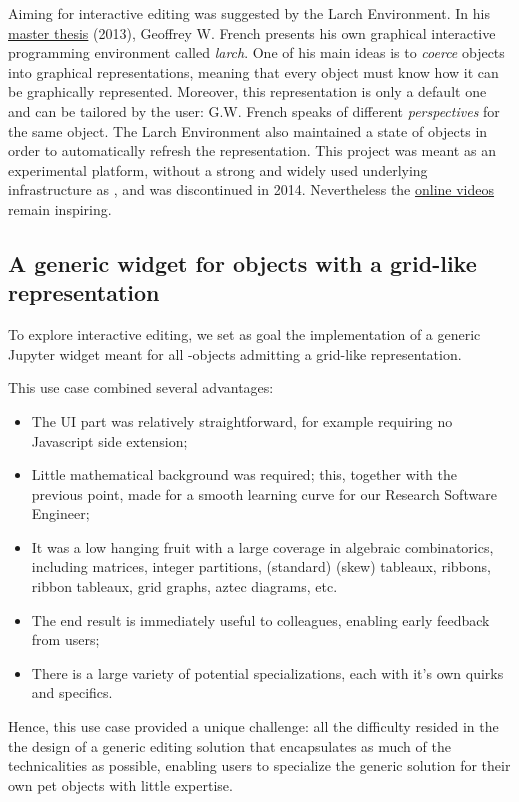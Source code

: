 \documentclass{deliverablereport}
\begin{document}
Aiming for interactive editing was suggested by the Larch Environment.
In his \href{https://core.ac.uk/download/pdf/9839511.pdf}{master
  thesis} (2013), Geoffrey W. French presents his own graphical
interactive programming environment called \emph{larch}. One of his
main ideas is to \emph{coerce} objects into graphical representations, 
meaning that every object must know how it can be graphically
represented. Moreover, this representation is only a default one and can be
tailored by the user: G.W. French speaks of different
\emph{perspectives} for the same object. The Larch Environment also
maintained a state of objects in order to automatically refresh the
representation. This project was meant as an experimental platform,
without a strong and widely used underlying infrastructure as \Jupyter,
and was discontinued in 2014. Nevertheless the
\href{https://www.youtube.com/watch?v=BaqaIw2c91o&t=29s}{online videos}
remain inspiring.

\subsection{A generic widget for objects with a grid-like representation}
\label{section:grid}

To explore interactive editing, we set as goal the implementation of a
generic Jupyter widget meant for all \Sage-objects admitting a
grid-like representation.

This use case combined several advantages:
\begin{itemize}
\item The UI part was relatively straightforward, for example
  requiring no Javascript side extension;
\item Little mathematical background was required; this, together with
  the previous point, made for a smooth learning curve for our
  Research Software Engineer;
\item It was a low hanging fruit with a large coverage in algebraic
  combinatorics, including matrices, integer partitions, (standard)
  (skew) tableaux, ribbons, ribbon tableaux, grid graphs, aztec
  diagrams, etc.
\item The end result is immediately useful to colleagues, enabling
  early feedback from users;
\item There is a large variety of potential specializations, each with
  it's own quirks and specifics.
\end{itemize}
Hence, this use case provided a unique challenge: all the difficulty
resided in the the design of a generic editing solution that encapsulates as
much of the technicalities as possible, enabling users to specialize
the generic solution for their own pet objects with little expertise.
\end{document}
